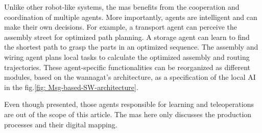 Unlike other robot-like systems, the \gls{mas} benefits from the 
cooperation and coordination of multiple agents. More importantly, agents 
are intelligent and can make their own decisions. For example, a transport 
agent can perceive the assembly street for optimized path planning. 
A storage agent can learn to find the shortest path to grasp the parts in 
an optimized sequence. The assembly and wiring agent plans local tasks 
to calculate the optimized assembly and routing trajectories. These 
agent-specific functionalities can be reorganized as different modules, 
based on the wannagat's architecture\cite{wannagat_agent_nodate}, as a 
specification of the local AI in the fig.\ref{fig: Msg-based-SW-architecture}. 


Even though presented, those agents responsible for learning 
and teleoperations are out of the scope of this article. The \gls{mas} here 
only discusses the production processes and their digital mapping.


